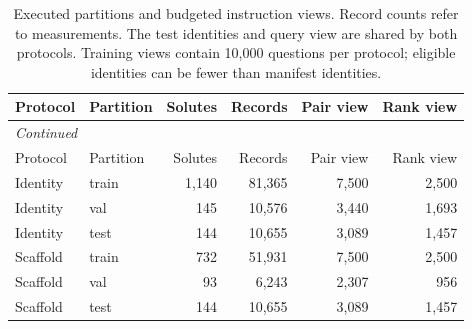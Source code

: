 \begingroup\footnotesize
\setlength{\tabcolsep}{3pt}
\begin{longtable}{llrrrr}
\caption{Executed partitions and budgeted instruction views. Record counts refer to measurements. The test identities and query view are shared by both protocols. Training views contain 10,000 questions per protocol; eligible identities can be fewer than manifest identities.}\label{tab:cohorts}\\
\toprule
Protocol & Partition & Solutes & Records & Pair view & Rank view \\
\midrule
\endfirsthead
\multicolumn{6}{l}{\textit{Continued}} \\
\toprule
Protocol & Partition & Solutes & Records & Pair view & Rank view \\
\midrule
\endhead
Identity & train & 1,140 & 81,365 & 7,500 & 2,500 \\
Identity & val & 145 & 10,576 & 3,440 & 1,693 \\
Identity & test & 144 & 10,655 & 3,089 & 1,457 \\
Scaffold & train & 732 & 51,931 & 7,500 & 2,500 \\
Scaffold & val & 93 & 6,243 & 2,307 & 956 \\
Scaffold & test & 144 & 10,655 & 3,089 & 1,457 \\
\bottomrule
\end{longtable}
\endgroup
